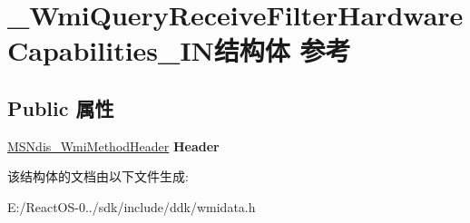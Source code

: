 \hypertarget{struct___wmi_query_receive_filter_hardware_capabilities___i_n}{}\section{\+\_\+\+Wmi\+Query\+Receive\+Filter\+Hardware\+Capabilities\+\_\+\+I\+N结构体 参考}
\label{struct___wmi_query_receive_filter_hardware_capabilities___i_n}
\subsection*{Public 属性}
\begin{DoxyCompactItemize}
\item 
\mbox{\label{struct___wmi_query_receive_filter_hardware_capabilities___i_n_adb09daedf594efc1e60f7c9e38fb1097}} 
\hyperlink{struct___m_s_ndis___wmi_method_header}{M\+S\+Ndis\+\_\+\+Wmi\+Method\+Header} {\bfseries Header}
\end{DoxyCompactItemize}


该结构体的文档由以下文件生成\+:\begin{DoxyCompactItemize}
\item 
E\+:/\+React\+O\+S-\/0../sdk/include/ddk/wmidata.\+h\end{DoxyCompactItemize}
